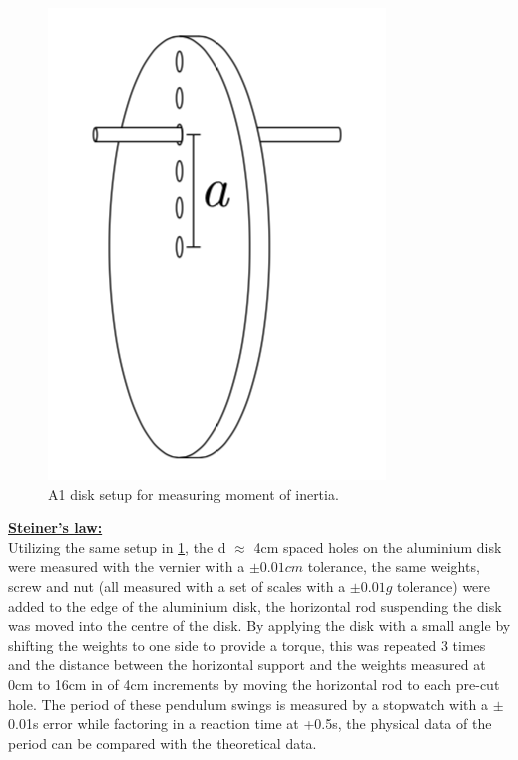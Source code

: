 \documentclass[12pt]{article}
\begin{document}
\begin{figure}[H]
\centering
\includegraphics[scale=0.6]{Images/Labscript/Steiners_Law_A1_Disk.png}
\caption{A1 disk setup for measuring moment of inertia. \cite{Exp.4-2019}}
\label{A1 Disk Setup}
\end{figure}

\textbf{\underline{Steiner's law:}} \\

Utilizing the same setup in \cref{A1 Disk Setup}, the d $\approx$ 4cm spaced holes on the aluminium disk were measured with the vernier with a $\pm0.01cm$ tolerance, the same weights, screw and nut (all measured with a set of scales with a $\pm0.01g$ tolerance) were added to the edge of the aluminium disk, the horizontal rod suspending the disk was moved into the centre of the disk. By applying the disk with a small angle by shifting the weights to one side to provide a torque, this was repeated 3 times and the distance between the horizontal support and the weights measured at 0cm to 16cm in of 4cm increments by moving the horizontal rod to each pre-cut hole. The period of these pendulum swings is measured by a stopwatch with a $\pm$0.01s error while factoring in a reaction time at +0.5s, the physical data of the period can be compared with the theoretical data. \\

\end{document}
